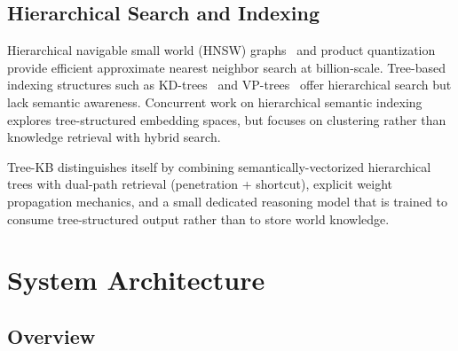 \documentclass[11pt,a4paper]{article}
\begin{document}
\subsection{Hierarchical Search and Indexing}

Hierarchical navigable small world (HNSW) graphs~\cite{malkov2018efficient} and product quantization~\cite{jegou2011product} provide efficient approximate nearest neighbor search at billion-scale. Tree-based indexing structures such as KD-trees~\cite{bentley1975multidimensional} and VP-trees~\cite{yianilos1993data} offer hierarchical search but lack semantic awareness. Concurrent work on hierarchical semantic indexing~\cite{zhu2023hierarchical} explores tree-structured embedding spaces, but focuses on clustering rather than knowledge retrieval with hybrid search.

Tree-KB distinguishes itself by combining semantically-vectorized hierarchical trees with dual-path retrieval (penetration + shortcut), explicit weight propagation mechanics, and a small dedicated reasoning model that is trained to consume tree-structured output rather than to store world knowledge.

\section{System Architecture}
\label{sec:architecture}

\subsection{Overview}
\end{document}
